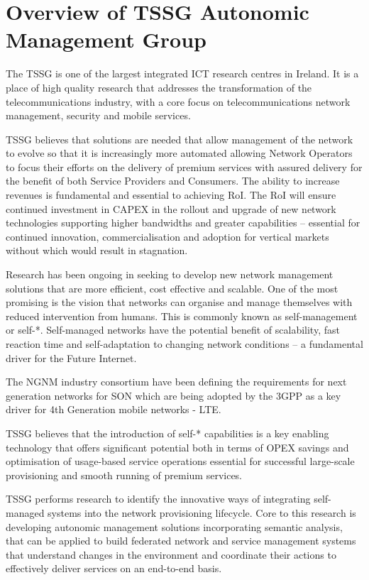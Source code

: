 \section{Overview of TSSG Autonomic Management Group}
The \acf{TSSG} is one of the largest integrated \acf{ICT} research centres in Ireland. It is a place of high quality research that addresses the transformation of the telecommunications industry, with a core focus on telecommunications network management, security and mobile services. 

\ac{TSSG} believes that solutions are needed that allow management of the network to evolve so that it is increasingly more automated allowing Network Operators to focus their efforts on the delivery of premium services with assured delivery for the benefit of both Service Providers and Consumers. The ability to increase revenues is fundamental and essential to achieving \acf{RoI}. The \acf{RoI} will ensure continued investment in \acf{CAPEX} in the rollout and upgrade of new network technologies supporting higher bandwidths and greater capabilities – essential for continued innovation, commercialisation and adoption for vertical markets without which would result in stagnation.

Research has been ongoing in seeking to develop new network management solutions that are more efficient, cost effective and scalable. One of the most promising is the vision that networks can organise and manage themselves with reduced intervention from humans. This is commonly known as self-management or self-*. Self-managed networks have the potential benefit of scalability, fast reaction time and self-adaptation to changing network conditions – a fundamental driver for the Future Internet. 

The \ac{NGNM} industry consortium have been defining the requirements for next generation networks for \ac{SON} which are being adopted by the 3GPP as a key driver for 4th Generation mobile networks - \ac{LTE}. 

\ac{TSSG} believes that the introduction of self-* capabilities is a key enabling technology that offers significant potential both in terms of OPEX savings and optimisation of usage-based service operations essential for successful large-scale provisioning and smooth running of premium services. 

\ac{TSSG} performs research to identify the innovative ways of integrating self-managed systems into the network provisioning lifecycle. Core to this research is developing autonomic management solutions incorporating semantic analysis, that can be applied to build federated network and service management systems that understand changes in the environment and coordinate their actions to effectively deliver services on an end-to-end basis.

